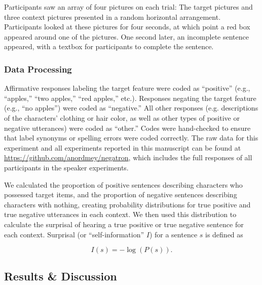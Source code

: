 \documentclass[man, floatsintext, noapacite]{apa6}
\begin{document}
Participants saw an array of four pictures on each trial: The target pictures and three context pictures presented in a random horizontal arrangement.  Participants looked at these pictures for four seconds, at which point a red box appeared around one of the pictures.  One second later, an incomplete sentence appeared, with a textbox for participants to complete the sentence. 

\subsubsection{Data Processing} 

Affirmative responses labeling the target feature were coded as ``positive'' (e.g., ``apples,'' ``two apples,'' ``red apples,'' etc.).  Responses negating the target feature (e.g., ``no apples'') were coded as ``negative.''  All other responses (e.g. descriptions of the characters' clothing or hair color, as well as other types of positive or negative utterances) were coded as ``other.''   Codes were hand-checked to ensure that label synonyms or spelling errors were coded correctly. The raw data for this experiment and all experiments reported in this manuscript can be found at \url{https://github.com/anordmey/negatron}, which includes the full responses of all participants in the speaker experiments. 

We calculated the proportion of positive sentences describing characters who possessed target items, and the proportion of negative sentences describing characters with nothing, creating probability distributions for true positive and true negative utterances in each context.  We then used this distribution to calculate the surprisal of hearing a true positive or true negative sentence for each context. Surprisal (or ``self-information'' $I$) for a sentence $s$ is defined as

\begin{equation}
\label{eq:surprise}
I(s) = -\log(P(s)).
\end{equation}

\subsection{Results \& Discussion}
\end{document}
